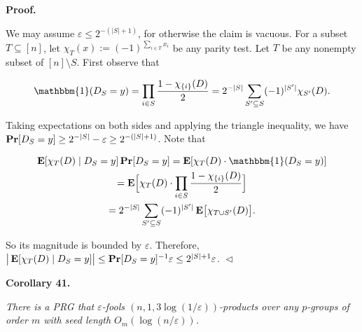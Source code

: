\documentclass[10pt,a4paper]{article}
\begin{document}



\par\medskip\noindent\textbf{
\textbf{Proof}.}\par




We may assume $\varepsilon\leq 2^{-(\lvert S\rvert+1)}$, for otherwise the claim is vacuous.
For a subset $T\subseteq[n]$, let $\chi_{T}(x):=(-1)^{\sum_{i\in T}x_{i}}$ be any parity test.
Let $T$ be any nonempty subset of $[n]\setminus S$.
First observe that\par


\[\begin{gathered}
\mathbbm{1}(D_{S}=y)=\prod_{i\in S}\frac{1-\chi_{\{i\}}(D)}{2}=2^{-\lvert S\rvert}\sum_{S^{\prime}\subseteq S}(-1)^{\lvert S^{\prime}\rvert}\chi_{S^{\prime}}(D).
\end{gathered}\]


Taking expectations on both sides and applying the triangle inequality, we have $\mathop{\bf Pr\/}[D_{S}=y]\geq 2^{-\lvert S\rvert}-\varepsilon\geq 2^{-(\lvert
S\rvert+1)}$.
Note that\par


\[\begin{gathered}
\displaystyle\mathop{\bf E\/}[\chi_{T}(D)\mid D_{S}=y]\mathop{\bf Pr\/}[D_{S}=y] \displaystyle=\mathop{\bf E\/}[\chi_{T}(D)\cdot\mathbbm{1}(D_{S}=y)] \\
\displaystyle=\mathop{\bf E\/}\Bigl{[}\chi_{T}(D)\cdot\prod_{i\in S}\frac{1-\chi_{\{i\}}(D)}{2}\Bigr{]} \\
\displaystyle=2^{-\lvert S\rvert}\sum_{S^{\prime}\subseteq S}(-1)^{\lvert S^{\prime}\rvert}\mathop{\bf E\/}\bigl{[}\chi_{T\cup S^{\prime}}(D)\bigr{]}.
\end{gathered}\]


So its magnitude is bounded by $\varepsilon$.
Therefore, $\big{\lvert}\mathop{\bf E\/}[\chi_{T}(D)\mid D_{S}=y]\big{\rvert}\leq\mathop{\bf Pr\/}[D_{S}=y]^{-1}\varepsilon\leq 2^{\lvert S\rvert+1}\varepsilon$.
$\vartriangleleft$\par





\par\medskip\noindent\textbf{
\textbf{Corollary 41}\textbf{.}
}\par



\emph{There is a PRG that $\varepsilon$-fools $(n,1,3\log(1/\varepsilon))$-products over any $p$-groups of order $m$ with seed length $O_{m}(\log(n/\varepsilon))$.}\par
\end{document}
